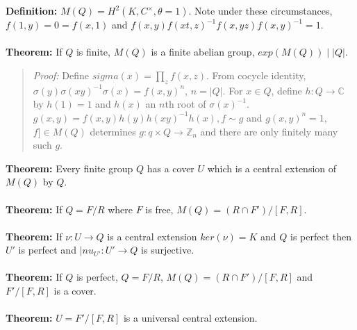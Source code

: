\\
\\
{\bf Definition:} $M(Q)= H^2(K,C^{\times}, \theta = 1)$.  Note under these circumstances,
$f(1,y)= 0 = f(x,1)$ and $f(x,y)f(xt,z)^{-1}f(x,yz) f(x,y)^{-1}=1$.
\\
\\
{\bf Theorem:} If $Q$ is finite, $M(Q)$ is a finite abelian group, $exp(M(Q)) \mid |Q|$.
\begin{quote}
\emph{Proof:}
Define $sigma(x) = \prod_z f(x,z)$.  From cocycle identity,
$\sigma(y)\sigma(xy)^{-1}\sigma(x) = f(x,y)^n$, $n = |Q|$.
For $x \in Q$, define $h:Q \rightarrow {\mathbb C}$ by $h(1)=1$ and $h(x)$ an $n$th root of $\sigma(x)^{-1}$.
$g(x,y)=f(x,y)h(y)h(xy)^{-1}h(x), f \sim g$ and $g(x,y)^n =1$, $f] \in M(Q)$ determines
$g: q \times Q \rightarrow {\mathbb Z}_n$ and there are only finitely many such $g$.
\end{quote}
{\bf Theorem:} Every finite group $Q$ has a cover $U$ which is a central extension of $M(Q)$ by $Q$.
\\
\\
{\bf Theorem:} If $Q=F/R$ where $F$ is free, $M(Q)= (R \cap F')/[F,R]$.
\\
\\
{\bf Theorem:} If $\nu: U \rightarrow Q$ is a central extension $ker(\nu)=K$ and $Q$ is perfect then
$U'$ is perfect and $|nu_{U'}: U' \rightarrow Q$ is surjective.
\\
\\
{\bf Theorem:} If $Q$ is perfect, $Q=F/R$, $M(Q)= (R \cap F')/[F,R]$ and $F'/[F,R]$ is a cover.
\\
\\
{\bf Theorem:} $U = F'/[F,R]$ is a universal central extension.
